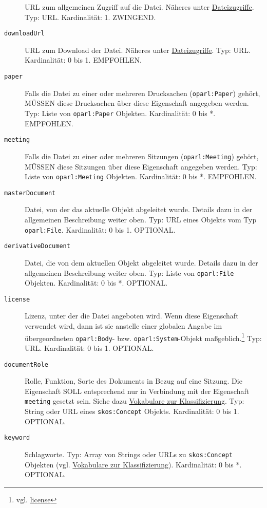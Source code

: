 \documentclass[,a4paper]{article}
\begin{document}
\begin{description}
URL zum allgemeinen Zugriff auf die Datei. Näheres unter
\hyperref[dateizugriff]{Dateizugriffe}. Typ: URL. Kardinalität: 1.
ZWINGEND.
\item[\texttt{downloadUrl}]
URL zum Download der Datei. Näheres unter
\hyperref[dateizugriff]{Dateizugriffe}. Typ: URL. Kardinalität: 0 bis 1.
EMPFOHLEN.
\item[\texttt{paper}]
Falls die Datei zu einer oder mehreren Drucksachen
(\texttt{oparl:Paper}) gehört, MÜSSEN diese Drucksachen über diese
Eigenschaft angegeben werden. Typ: Liste von \texttt{oparl:Paper}
Objekten. Kardinalität: 0 bis *. EMPFOHLEN.
\item[\texttt{meeting}]
Falls die Datei zu einer oder mehreren Sitzungen
(\texttt{oparl:Meeting}) gehört, MÜSSEN diese Sitzungen über diese
Eigenschaft angegeben werden. Typ: Liste von \texttt{oparl:Meeting}
Objekten. Kardinalität: 0 bis *. EMPFOHLEN.
\item[\texttt{masterDocument}]
Datei, von der das aktuelle Objekt abgeleitet wurde. Details dazu in der
allgemeinen Beschreibung weiter oben. Typ: URL eines Objekts vom Typ
\texttt{oparl:File}. Kardinalität: 0 bis 1. OPTIONAL.
\item[\texttt{derivativeDocument}]
Datei, die von dem aktuellen Objekt abgeleitet wurde. Details dazu in
der allgemeinen Beschreibung weiter oben. Typ: Liste von
\texttt{oparl:File} Objekten. Kardinalität: 0 bis *. OPTIONAL.
\item[\texttt{license}]
Lizenz, unter der die Datei angeboten wird. Wenn diese Eigenschaft
verwendet wird, dann ist sie anstelle einer globalen Angabe im
übergeordneten \texttt{oparl:Body}- bzw. \texttt{oparl:System}-Objekt
maßgeblich.\footnote{vgl. \hyperref[eigenschaftux5flicense]{license}}
Typ: URL. Kardinalität: 0 bis 1. OPTIONAL.
\item[\texttt{documentRole}]
Rolle, Funktion, Sorte des Dokuments in Bezug auf eine Sitzung. Die
Eigenschaft SOLL entsprechend nur in Verbindung mit der Eigenschaft
\texttt{meeting} gesetzt sein. Siehe dazu
\hyperref[vokabulareux5fklassifizierung]{Vokabulare zur
Klassifizierung}. Typ: String oder URL eines \texttt{skos:Concept}
Objekts. Kardinalität: 0 bis 1. OPTIONAL.
\item[\texttt{keyword}]
Schlagworte. Typ: Array von Strings oder URLs zu \texttt{skos:Concept}
Objekten (vgl. \hyperref[vokabulareux5fklassifizierung]{Vokabulare zur
Klassifizierung}). Kardinalität: 0 bis *. OPTIONAL.
\end{description}

\end{document}
